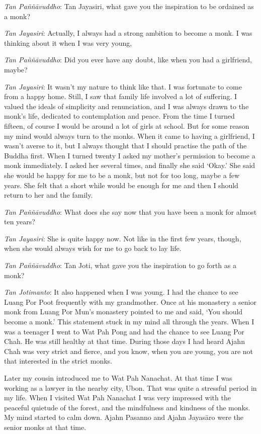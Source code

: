 \emph{Tan Paññāvuddho}‎: Tan Jayasiri, what gave you the inspiration to
be ordained as a monk?

\emph{Tan Jayasiri}: Actually, I always had a strong ambition to become
a monk. I was thinking about it when I was very young,

\emph{Tan Paññāvuddho}‎: Did you ever have any doubt, like when you had
a girlfriend, maybe?

\emph{Tan Jayasiri}: It wasn't my nature to think like that. I was
fortunate to come from a happy home. Still, I saw that family life
involved a lot of suffering. I valued the ideals of simplicity and
renunciation, and I was always drawn to the monk's life, dedicated to
contemplation and peace. From the time I turned fifteen, of course I
would be around a lot of girls at school. But for some reason my mind
would always turn to the monks. When it came to having a girlfriend, I
wasn't averse to it, but I always thought that I should practise the
path of the Buddha first. When I turned twenty I asked my mother's
permission to become a monk immediately. I asked her several times, and
finally she said `Okay.' She said she would be happy for me to be a
monk, but not for too long, maybe a few years. She felt that a short
while would be enough for me and then I should return to her and the
family.

\emph{Tan Paññāvuddho}‎: What does she say now that you have been a monk
for almost ten years?

\emph{Tan Jayasiri}: She is quite happy now. Not like in the first few
years, though, when she would always wish for me to go back to lay life.

\emph{Tan Paññāvuddho}‎: Tan Joti, what gave you the inspiration to go
forth as a monk?

\emph{Tan Jotimanto}: It also happened when I was young. I had the
chance to see Luang Por Poot frequently with my grandmother. Once at his
monastery a senior monk from Luang Por Mun's monastery pointed to me and
said, `You should become a monk.' This statement stuck in my mind all
through the years. When I was a teenager I went to Wat Pah Pong and had
the chance to see Luang Por Chah. He was still healthy at that time.
During those days I had heard Ajahn Chah was very strict and fierce, and
you know, when you are young, you are not that interested in the strict
monks.

Later my cousin introduced me to Wat Pah Nanachat. At that time I was
working as a lawyer in the nearby city, Ubon. That was quite a stressful
period in my life. When I visited Wat Pah Nanachat I was very impressed
with the peaceful quietude of the forest, and the mindfulness and
kindness of the monks. My mind started to calm down. Ajahn Pasanno and
Ajahn Jayasāro were the senior monks at that time.

